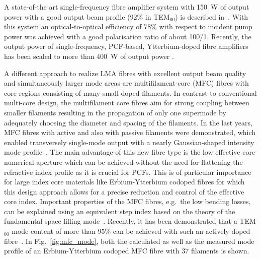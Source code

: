 A state-of-the art single-frequency fibre amplifier system with 150~W of output power with a good output beam profile (92\% in TEM$_{00}$) is described in~\cite{Hildebrandt2006}. With this system an optical-to-optical efficiency of 78\% with respect to incident pump power was achieved with a good polarisation ratio of about 100/1. Recently, the output power of single-frequency, PCF-based, Ytterbium-doped fibre amplifiers has been scaled to more than 400~W of output power \cite{Robin2010}.

A different approach to realize LMA fibres with excellent output beam quality and simultaneously larger mode areas are multifilament-core (MFC) fibres with core regions consisting of many small doped filaments.  In contrast to conventional multi-core design, the multifilament core fibres aim for strong coupling between smaller filaments resulting in the propagation of only one supermode by adequately choosing the diameter and spacing of the filaments. In the last years, MFC fibres with active and also with passive filaments were demonstrated, which enabled transversely single-mode output with a nearly Gaussian-shaped intensity mode profile~\cite{Canat2008,Vogel2009}. The main advantage of this new fibre type is the low effective core numerical aperture which can be achieved without the need for flattening the refractive index profile as it is crucial for PCFs. This is of particular importance for large index core materials like Erbium-Ytterbium codoped fibres for which this design approach allows for a precise reduction and control of the effective core index. Important properties of the MFC fibres, e.g.\ the low bending losses, can be explained using an equivalent step index based on the theory of the fundamental space filling mode~\cite{Canat2010}. Recently, it has been demonstrated that a TEM$_{00}$ mode content of more than 95\% can be achieved with such an actively doped fibre~\cite{Kuhn2010}. In Fig.~\ref{fig:mfc_mode}, both the calculated as well as the measured mode profile of an Erbium-Ytterbium codoped MFC fibre with 37 filaments is shown.

